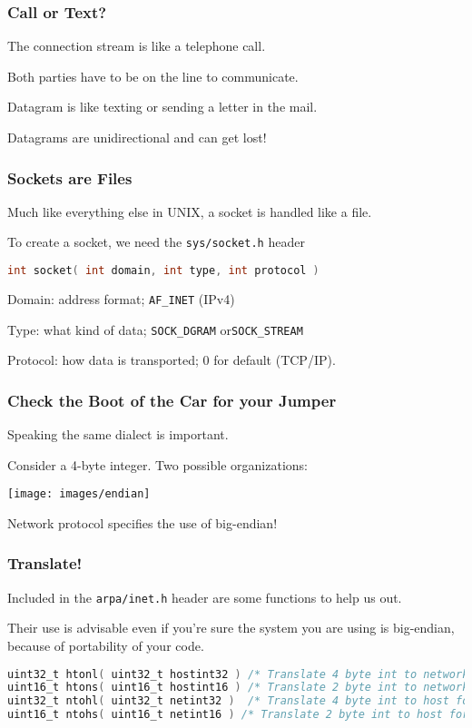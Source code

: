 \begin{frame}
	\frametitle{Call or Text?}

	The connection stream is like a telephone call.

	Both parties have to be on the line to communicate.

	Datagram is like texting or sending a letter in the mail.

	Datagrams are unidirectional and can get lost!


\end{frame}

\begin{frame}[fragile]
	\frametitle{Sockets are Files}

	Much like everything else in UNIX, a socket is handled like a file.

	To create a socket, we need the \texttt{sys/socket.h} header

	\begin{lstlisting}[language=C]
int socket( int domain, int type, int protocol )
\end{lstlisting}

	Domain: address format; \texttt{AF\_INET} (IPv4)

	Type: what kind of data; \texttt{SOCK\_DGRAM} or\texttt {SOCK\_STREAM}

	Protocol: how data is transported; 0 for default (TCP/IP).

\end{frame}


\begin{frame}
	\frametitle{Check the Boot of the Car for your Jumper}

	Speaking the same dialect is important.

	Consider a 4-byte integer. Two possible organizations:

	\begin{center}
		\texttt{[image: images/endian]}
	\end{center}

	Network protocol specifies the use of big-endian!

\end{frame}


\begin{frame}[fragile]
	\frametitle{Translate!}

	Included in the \texttt{arpa/inet.h} header are some functions to help us out.

	Their use is advisable even if you're sure the system you are using is big-endian, because of portability of your code.

	\begin{lstlisting}[language=C]
uint32_t htonl( uint32_t hostint32 ) /* Translate 4 byte int to network format */
uint16_t htons( uint16_t hostint16 ) /* Translate 2 byte int to network format */
uint32_t ntohl( uint32_t netint32 )  /* Translate 4 byte int to host format */
uint16_t ntohs( uint16_t netint16 ) /* Translate 2 byte int to host format */
\end{lstlisting}


\end{frame}


